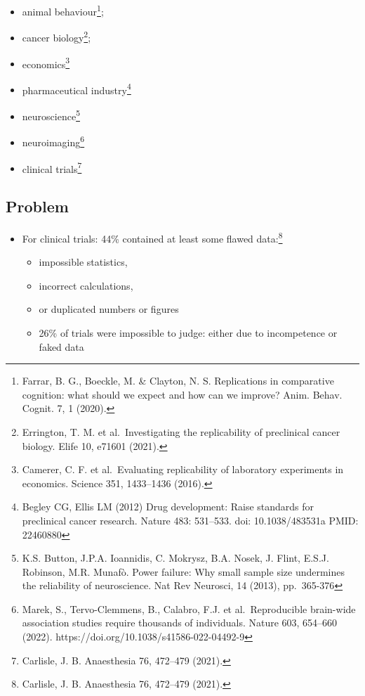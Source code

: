 \documentclass[
  letterpaper,
  DIV=11,
  numbers=noendperiod]{scrartcl}
\providecommand{\tightlist}{%
  \setlength{\itemsep}{0pt}\setlength{\parskip}{0pt}}\usepackage{longtable,booktabs,array}
\begin{document}
\begin{itemize}
\tightlist
\item
  animal behaviour\footnote{Farrar, B. G., Boeckle, M. \& Clayton, N. S.
    Replications in comparative cognition: what should we expect and how
    can we improve? Anim. Behav. Cognit. 7, 1 (2020).};
\item
  cancer biology\footnote{Errington, T. M. et al.~Investigating the
    replicability of preclinical cancer biology. Elife 10, e71601
    (2021).};
\item
  economics\footnote{Camerer, C. F. et al.~Evaluating replicability of
    laboratory experiments in economics. Science 351, 1433--1436 (2016).}
\item
  pharmaceutical industry\footnote{Begley CG, Ellis LM (2012) Drug
    development: Raise standards for preclinical cancer research. Nature
    483: 531--533. doi: 10.1038/483531a PMID: 22460880}
\item
  neuroscience\footnote{K.S. Button, J.P.A. Ioannidis, C. Mokrysz, B.A.
    Nosek, J. Flint, E.S.J. Robinson, M.R. Munafò. Power failure: Why
    small sample size undermines the reliability of neuroscience. Nat
    Rev Neurosci, 14 (2013), pp.~365-376}
\item
  neuroimaging\footnote{Marek, S., Tervo-Clemmens, B., Calabro, F.J. et
    al.~Reproducible brain-wide association studies require thousands of
    individuals. Nature 603, 654--660 (2022).
    https://doi.org/10.1038/s41586-022-04492-9}
\item
  clinical trials\footnote{Carlisle, J. B. Anaesthesia 76, 472--479
    (2021).}
\end{itemize}

\subsection{Problem}\label{problem-5}

\begin{itemize}
\tightlist
\item
  For clinical trials: 44\% contained at least some flawed
  data:\footnote{Carlisle, J. B. Anaesthesia 76, 472--479 (2021).}

  \begin{itemize}
  \tightlist
  \item
    impossible statistics,
  \item
    incorrect calculations,
  \item
    or duplicated numbers or figures
  \item
    26\% of trials were impossible to judge: either due to incompetence
    or faked data
  \end{itemize}
\end{itemize}
\end{document}
